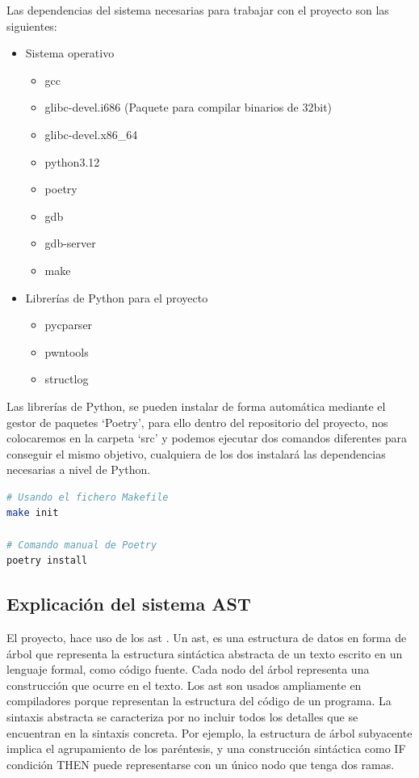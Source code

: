 Las dependencias del sistema necesarias para trabajar con el proyecto son las siguientes:
\begin{itemize}
    \item Sistema operativo
    \begin{itemize}
        \item \acrshort{gcc}
        \item glibc-devel.i686 (Paquete para compilar binarios de 32bit)
        \item glibc-devel.x86\_64
        \item python3.12
        \item poetry \cite{poetry-install}
        \item gdb
        \item gdb-server
        \item make
    \end{itemize}
    \item Librerías de Python para el proyecto
    \begin{itemize}
        \item pycparser \cite{pycparser}
        \item pwntools \cite{pwntools}
        \item structlog \cite{structlog}
    \end{itemize}
\end{itemize}

Las librerías de Python, se pueden instalar de forma automática mediante el gestor de paquetes `Poetry', para ello dentro del repositorio del proyecto, nos colocaremos en la carpeta `src' y podemos ejecutar dos comandos diferentes para conseguir el mismo objetivo, cualquiera de los dos instalará las dependencias necesarias a nivel de Python.

\begin{lstlisting}[language=bash]
# Usando el fichero Makefile
make init

# Comando manual de Poetry
poetry install
\end{lstlisting}

\subsection{Explicación del sistema AST}
El proyecto, hace uso de los \acrfull{ast} \cite{ast}. Un \acrshort{ast}, es una estructura de datos en forma de árbol que representa la estructura sintáctica abstracta de un texto escrito en un lenguaje formal, como código fuente. Cada nodo del árbol representa una construcción que ocurre en el texto. Los \acrshort{ast} son usados ampliamente en compiladores porque representan la estructura del código de un programa. La sintaxis abstracta se caracteriza por no incluir todos los detalles que se encuentran en la sintaxis concreta. Por ejemplo, la estructura de árbol subyacente implica el agrupamiento de los paréntesis, y una construcción sintáctica como IF condición THEN puede representarse con un único nodo que tenga dos ramas.

